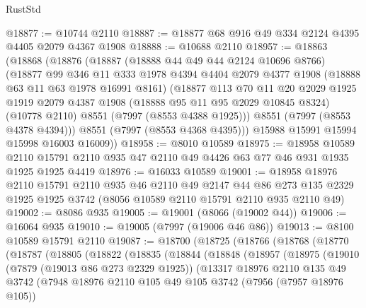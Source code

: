 \begin{lexlean}{RustStd}
\begin{coremodule}
@18877 := @10744 @2110
@18887 := @18877 @68 @916 @49 @334 @2124 @4395 @4405 @2079 @4367 @1908
@18888 := @10688 @2110
@18957 := @18863
    (@18868
      (@18876
        (@18887
          (@18888 @44 @49 @44 @2124 @10696 @8766)
          (@18877
            @99
            @346
            @11
            @333
            @1978
            @4394
            @4404
            @2079
            @4377
            @1908
            (@18888 @63 @11 @63 @1978 @16991 @8161)
            (@18877
              @113
              @70
              @11
              @20
              @2029
              @1925
              @1919
              @2079
              @4387
              @1908
              (@18888 @95 @11 @95 @2029 @10845 @8324)
              (@10778 @2110)
              @8551
              (@7997 (@8553 @4388 @1925)))
            @8551
            (@7997 (@8553 @4378 @4394)))
          @8551
          (@7997 (@8553 @4368 @4395)))
        @15988
        @15991
        @15994
        @15998
        @16003
        @16009))
@18958 := @8010 @10589
@18975 := @18958
    @10589
    @2110
    @15791
    @2110
    @935
    @47
    @2110
    @49
    @4426
    @63
    @77
    @46
    @931
    @1935
    @1925
    @1925
    @4419
@18976 := @16033 @10589
@19001 := @18958
    @18976
    @2110
    @15791
    @2110
    @935
    @46
    @2110
    @49
    @2147
    @44
    @86
    @273
    @135
    @2329
    @1925
    @1925
    @3742
    (@8056 @10589 @2110 @15791 @2110 @935 @2110 @49)
@19002 := @8086 @935
@19005 := @19001 (@8066 (@19002 @44))
@19006 := @16064 @935
@19010 := @19005 (@7997 (@19006 @46 @86))
@19013 := @8100 @10589 @15791 @2110
@19087 := @18700
    (@18725
      (@18766
        (@18768
          (@18770
            (@18787
              (@18805
                (@18822
                  (@18835
                    (@18844
                      (@18848
                        (@18957
                          (@18975
                            (@19010
                              (@7879 (@19013 @86 @273 @2329 @1925))
                              (@13317
                                @18976
                                @2110
                                @135
                                @49
                                @3742
                                (@7948
                                  @18976
                                  @2110
                                  @105
                                  @49
                                  @105
                                  @3742
                                  (@7956 (@7957 @18976 @105))

\end{coremodule}
\end{lexlean}
